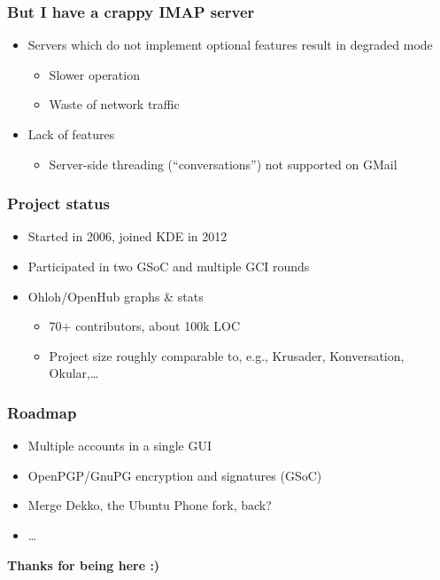 \documentclass{beamer}
\begin{document}
\begin{frame}[fragile]
  \frametitle{But I have a crappy IMAP server}
  \begin{itemize}
    \item Servers which do not implement optional features result in degraded mode
      \begin{itemize}
        \item Slower operation
        \item Waste of network traffic
      \end{itemize}
    \item Lack of features
      \begin{itemize}
        \item Server-side threading (``conversations'') not supported on GMail
      \end{itemize}
  \end{itemize}
\end{frame}

\begin{frame}[fragile]
  \frametitle{Project status}
  \begin{itemize}
    \item Started in 2006, joined KDE in 2012
    \item Participated in two GSoC and multiple GCI rounds
    \item Ohloh/OpenHub graphs \& stats
      \begin{itemize}
        \item 70+ contributors, about 100k LOC
        \item Project size roughly comparable to, e.g., Krusader, Konversation, Okular,\ldots
      \end{itemize}
  \end{itemize}
\end{frame}

\begin{frame}[fragile]
  \frametitle{Roadmap}
  \begin{itemize}
    \item Multiple accounts in a single GUI
    \item OpenPGP/GnuPG encryption and signatures (GSoC)
    \item Merge Dekko, the Ubuntu Phone fork, back?
    \item \ldots
  \end{itemize}
\end{frame}

\begin{frame}[plain]
  \begin{center}
    \textbf{\LARGE{Thanks for being here :)}}
  \end{center}
\end{frame}
\end{document}

